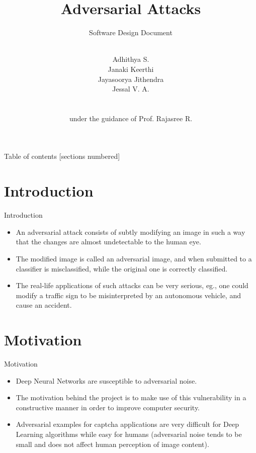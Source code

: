 \documentclass[10pt]{beamer}
\title{Adversarial Attacks}
\subtitle{Software Design Document}
\date{}
\author{\\Adhithya S.\\Janaki Keerthi\\Jayasoorya Jithendra\\Jessal V. A.\\\\\\under the guidance of Prof. Rajasree R.}
\begin{document}
\maketitle

\begin{frame}{Table of contents}
  [sections numbered]
  \vspace{0.51in}
  \tableofcontents
\end{frame}

\section{Introduction}

\begin{frame}{Introduction}
\begin{itemize}
\item An adversarial attack consists of subtly modifying an image in such a way that the changes are
almost undetectable to the human eye.
\item The modified image
is called an adversarial image, and when submitted to a
classifier is misclassified, while the original one is correctly
classified.
\item The real-life applications of such attacks can be
very serious, eg., one could modify a traffic sign to
be misinterpreted by an autonomous vehicle, and cause an
accident.
\end{itemize}
  
\end{frame}

\section{Motivation}

\begin{frame}{Motivation}
\begin{itemize}
    \item Deep Neural Networks are susceptible to adversarial noise.
\item The motivation behind the project is to make use of this vulnerability in a constructive manner in order to improve computer security.
\item Adversarial examples for captcha applications are very difficult for Deep Learning algorithms while easy for humans (adversarial noise tends to be small and does not affect human perception of image
content).
\end{itemize}
	
\end{frame}
\end{document}
